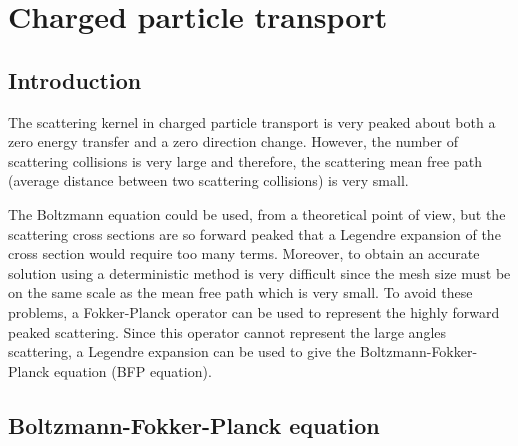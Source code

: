 \chapter{Charged particle transport}
\section{Introduction}
The scattering kernel in charged particle transport is very peaked about both
a zero energy transfer and a zero direction change. However, the number of
scattering collisions is very large and therefore, the scattering mean free
path (average distance between two scattering collisions) is very small. 

The Boltzmann equation could be used, from a theoretical point of view, but
the scattering cross sections are so forward peaked that a Legendre expansion
of the cross section would require too many terms. Moreover, to obtain an
accurate solution using a deterministic method is very difficult since the
mesh size must be on the same scale as the mean free path which is very
small\cite{pomraning}. To avoid these problems, a Fokker-Planck operator can
be used to represent the highly forward peaked scattering. Since this operator 
cannot represent the large angles scattering, a Legendre expansion can be
used to give the Boltzmann-Fokker-Planck equation (BFP equation)\cite{ligou}.

\section{Boltzmann-Fokker-Planck equation}
